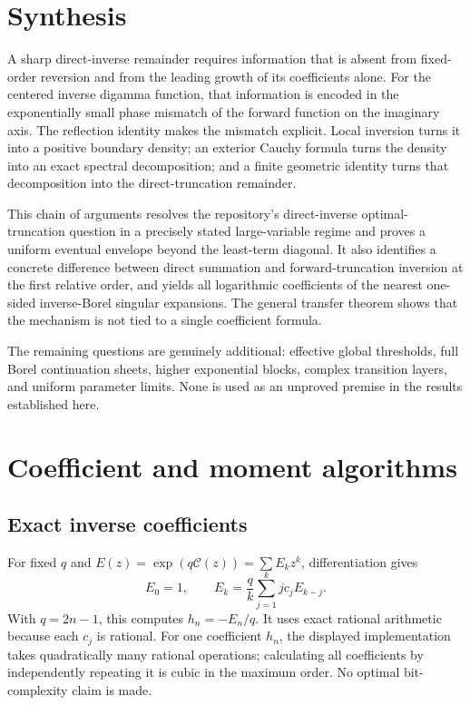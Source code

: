 \documentclass[11pt,a4paper]{article}
\theoremstyle{definition}
\numberwithin{equation}{section}
\newcommand{\cformal}{\mathcal C}
\begin{document}
\section{Synthesis}
\label{sec:conclusion}

A sharp direct-inverse remainder requires information that is absent from fixed-order reversion and from the leading growth of its coefficients alone. For the centered inverse digamma function, that information is encoded in the exponentially small phase mismatch of the forward function on the imaginary axis. The reflection identity makes the mismatch explicit. Local inversion turns it into a positive boundary density; an exterior Cauchy formula turns the density into an exact spectral decomposition; and a finite geometric identity turns that decomposition into the direct-truncation remainder.

This chain of arguments resolves the repository's direct-inverse optimal-truncation question in a precisely stated large-variable regime and proves a uniform eventual envelope beyond the least-term diagonal. It also identifies a concrete difference between direct summation and forward-truncation inversion at the first relative order, and yields all logarithmic coefficients of the nearest one-sided inverse-Borel singular expansions. The general transfer theorem shows that the mechanism is not tied to a single coefficient formula.

The remaining questions are genuinely additional: effective global thresholds, full Borel continuation sheets, higher exponential blocks, complex transition layers, and uniform parameter limits. None is used as an unproved premise in the results established here.

\appendix
\section{Coefficient and moment algorithms}
\label{app:algorithms}

\subsection{Exact inverse coefficients}
For fixed $q$ and $E(z)=\exp(q\cformal(z))=\sum E_kz^k$, differentiation gives
\begin{equation}
 E_0=1,\qquad
 E_k=\frac qk\sum_{j=1}^k j c_jE_{k-j}.
 \label{eq:E-recurrence}
\end{equation}
With $q=2n-1$, this computes $h_n=-E_n/q$. It uses exact rational arithmetic because each $c_j$ is rational. For one coefficient $h_n$, the displayed implementation takes quadratically many rational operations; calculating all coefficients by independently repeating it is cubic in the maximum order. No optimal bit-complexity claim is made.
\end{document}
